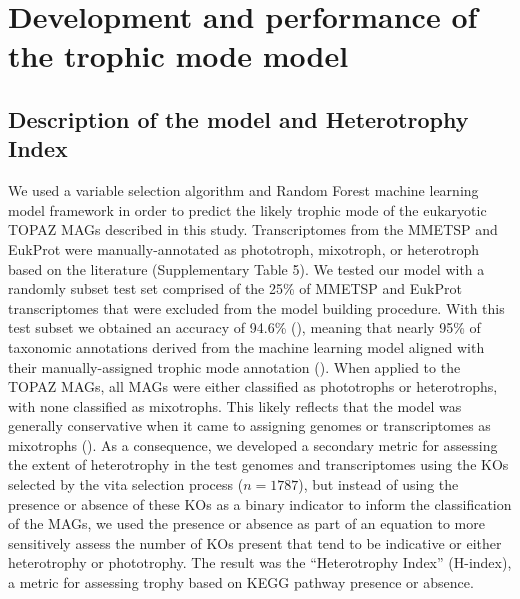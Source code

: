 \documentclass[12pt]{article}
\numberwithin{equation}{section}
\begin{document}




\section{Development and performance of the trophic mode model}

\subsection{Description of the model and Heterotrophy Index}
We used a variable selection algorithm and Random Forest machine learning model framework in order to predict the likely trophic mode of the eukaryotic TOPAZ MAGs described in this study. Transcriptomes from the MMETSP and EukProt were manually-annotated as phototroph, mixotroph, or heterotroph based on the literature (Supplementary Table 5). We tested our model with a randomly subset test set comprised of the 25\% of MMETSP and EukProt transcriptomes \citep{Keeling2014,Richter2020EukProt} that were excluded from the model building procedure. With this test subset we obtained an accuracy of 94.6\% (), meaning that nearly 95\% of taxonomic annotations derived from the machine learning model aligned with their manually-assigned trophic mode annotation ().  When applied to the TOPAZ MAGs, all MAGs were either classified as phototrophs or heterotrophs, with none classified as  mixotrophs. This likely reflects that the model was generally conservative when it came to assigning genomes or transcriptomes as mixotrophs (). As a consequence, we developed a secondary metric for assessing the extent of heterotrophy in the test genomes and transcriptomes using the KOs selected by the vita selection process ($n=1787$), but instead of using the presence or absence of these KOs as a binary indicator to inform the classification of the MAGs, we used the presence or absence as part of an equation to more sensitively assess the number of KOs present that tend to be indicative or either heterotrophy or phototrophy. The result was the ``Heterotrophy Index'' (H-index), a metric for assessing trophy based on KEGG pathway presence or absence. 
\end{document}
